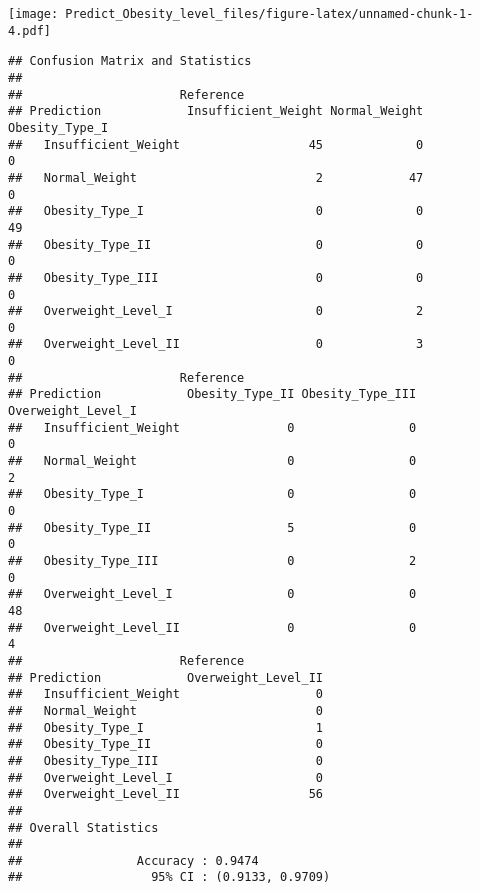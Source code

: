 \documentclass[
]{article}
\newenvironment{Shaded}{\begin{snugshade}}{\end{snugshade}}
\newcommand{\FunctionTok}[1]{\textcolor[rgb]{0.13,0.29,0.53}{\textbf{#1}}}
\newcommand{\NormalTok}[1]{#1}
\newcommand{\OtherTok}[1]{\textcolor[rgb]{0.56,0.35,0.01}{#1}}
\newcommand{\SpecialCharTok}[1]{\textcolor[rgb]{0.81,0.36,0.00}{\textbf{#1}}}
\begin{document}
\texttt{[image: Predict\_Obesity\_level\_files/figure-latex/unnamed-chunk-1-4.pdf]}

\begin{Shaded}
\end{Shaded}

\begin{verbatim}
## Confusion Matrix and Statistics
## 
##                      Reference
## Prediction            Insufficient_Weight Normal_Weight Obesity_Type_I
##   Insufficient_Weight                  45             0              0
##   Normal_Weight                         2            47              0
##   Obesity_Type_I                        0             0             49
##   Obesity_Type_II                       0             0              0
##   Obesity_Type_III                      0             0              0
##   Overweight_Level_I                    0             2              0
##   Overweight_Level_II                   0             3              0
##                      Reference
## Prediction            Obesity_Type_II Obesity_Type_III Overweight_Level_I
##   Insufficient_Weight               0                0                  0
##   Normal_Weight                     0                0                  2
##   Obesity_Type_I                    0                0                  0
##   Obesity_Type_II                   5                0                  0
##   Obesity_Type_III                  0                2                  0
##   Overweight_Level_I                0                0                 48
##   Overweight_Level_II               0                0                  4
##                      Reference
## Prediction            Overweight_Level_II
##   Insufficient_Weight                   0
##   Normal_Weight                         0
##   Obesity_Type_I                        1
##   Obesity_Type_II                       0
##   Obesity_Type_III                      0
##   Overweight_Level_I                    0
##   Overweight_Level_II                  56
## 
## Overall Statistics
##                                           
##                Accuracy : 0.9474          
##                  95% CI : (0.9133, 0.9709)

\end{verbatim}
\end{document}
